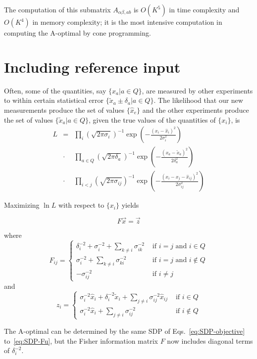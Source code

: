 \documentclass{article}
\begin{document}
The computation of this submatrix $A_{\alpha\beta,ab}$ is $O(K^5)$ in
time complexity and $O(K^4)$ in memory complexity; it is the most
intensive computation in computing the A-optimal by cone programming.

\section{Including reference input}

Often, some of the quantities, say $\{x_a|a\in Q\}$, are measured by
other experiments to within certain statistical error $\{\tilde{x}_a
\pm \delta_a|a\in Q\}$. The likelihood that our new measurements
produce the set of values $\{ \hat{x}_e \}$ and the other experiments
produce the set of values $\{ \tilde{x}_a | a\in Q\}$, given the true
values of the quantities of $\{ x_i \}$, is
\begin{eqnarray}
L &=& \prod_i (\sqrt{2\pi \sigma_i})^{-1} 
  \exp\left( -\frac{(x_i - \hat{x}_i)^2}{2\sigma_i^2} \right)
\nonumber \\
  &\cdot& \prod_{a\in Q} (\sqrt{2\pi \delta_a})^{-1}
  \exp\left( -\frac{(x_a - \tilde{x}_a)^2}{2\delta_a^2} \right)
\nonumber \\
  &\cdot& \prod_{i<j} (\sqrt{2\pi \sigma_{ij}})^{-1}
  \exp\left( -\frac{(x_i - x_j - \hat{x}_{ij})^2}{2\sigma_{ij}^2}\right)
\label{eq:likelihood}
\end{eqnarray}

Maximizing $\ln L$ with respect to $\{ x_i \}$ yields

\begin{equation}
F \vec{x} = \vec{z}
\end{equation}

where
\begin{equation}
F_{ij} = \left\{
\begin{array}{cl}
\delta_i^{-2} + \sigma_i^{-2} + \sum_{k\neq i} \sigma_{ik}^{-2} & \text{ if } i = j \text{ and } i\in Q \\
\sigma_i^{-2} + \sum_{k\neq i} \sigma_{ki}^{-2} & \text{ if } i=j \text{ and } i\notin Q \\
-\sigma_{ij}^{-2} & \text{ if } i\neq j
\end{array}
\right.
\label{eq:Fisher-information-matrix}
\end{equation}
and
\begin{equation}
z_i = \left\{
\begin{array}{cl}
\sigma_i^{-2} \hat{x}_i + \delta_i^{-2} \tilde{x}_i + \sum_{j\neq i}\sigma_{ij}^{-2} \hat{x}_{ij} & \text{ if } i \in Q \\
\sigma_i^{-2} \hat{x}_i + \sum_{j\neq i}\sigma_{ij}^{-2} & \text{ if } i \notin Q
\end{array}
\right.
\end{equation}

The A-optimal can be determined by the same SDP of
Eqs.~\ref{eq:SDP-objective} to~\ref{eq:SDP-Fu}, but the Fisher
information matrix $F$ now includes diagonal terms of $\delta_i^{-2}$.
\end{document}
